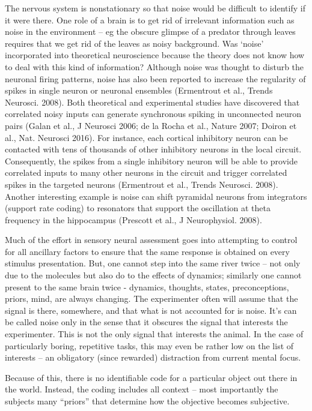 \documentclass[12pt]{article}
\begin{document}
The nervous system is nonstationary so that noise would be difficult to identify if it were there. One role of a brain is to get rid of irrelevant information such as noise in
the environment -- eg the obscure glimpse of a predator through leaves requires that we get rid of the leaves as noisy background.
Was ‘noise’ incorporated into theoretical neuroscience because the theory does not know how to deal with this kind of information? Although noise was thought to disturb the
neuronal firing patterns, noise has also been reported to increase the regularity of spikes in single neuron or neuronal ensembles (Ermentrout et al., Trends Neurosci. 2008).
Both theoretical and experimental studies have discovered that correlated noisy inputs can generate synchronous spiking in unconnected neuron pairs (Galan et al., J Neurosci
2006; de la Rocha et al., Nature 2007; Doiron et al., Nat. Neurosci 2016). For instance, each cortical inhibitory neuron can be contacted with tens of thousands of other
inhibitory neurons in the local circuit. Consequently, the spikes from a single inhibitory neuron will be able to provide correlated inputs to many other neurons in the
circuit and trigger correlated spikes in the targeted neurons (Ermentrout et al., Trends Neurosci. 2008). Another interesting example is noise can shift pyramidal neurons from
integrators (support rate coding) to resonators that support the oscillation at theta frequency in the hippocampus (Prescott et al., J Neurophysiol. 2008).

Much of the effort in sensory neural assessment goes into attempting to control for all ancillary factors to ensure that the same response is obtained on every stimulus
presentation. But, one cannot step into the same river twice -- not only due to the molecules but also do to the effects of dynamics; similarly one cannot present to the same
brain twice - dynamics, thoughts, states, preconceptions, priors, mind, are always changing. The experimenter often will assume that the signal is there, somewhere, and that
what is not accounted for is noise. It’s can be called noise only in the sense that it obscures the signal that interests the experimenter. This is not the only signal that
interests the animal. In the case of particularly boring, repetitive tasks, this may even be rather low on the list of interests -- an obligatory (since rewarded) distraction
from current mental focus.

Because of this, there is no identifiable code for a particular object out there in the world. Instead, the coding includes all context -- most importantly the subjects many
“priors” that determine how the objective becomes subjective.
\end{document}
